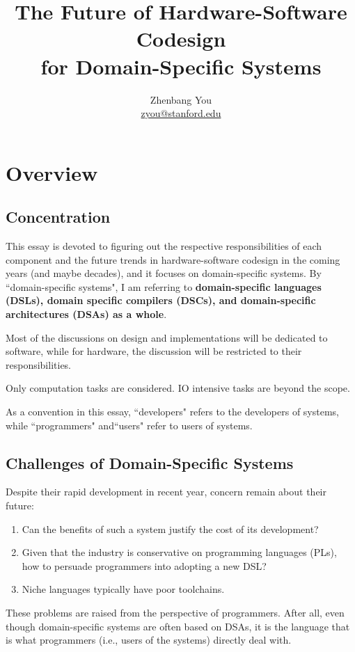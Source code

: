 \documentclass[11pt]{article}
\title{The Future of Hardware-Software Codesign\\for Domain-Specific Systems}
\author{Zhenbang You\\ \href{zyou@stanford.edu}{zyou@stanford.edu}}
\date{}
\begin{document}
\maketitle

\section{Overview}

\subsection{Concentration}
This essay is devoted to figuring out the respective responsibilities of each component and the future trends in hardware-software codesign in the coming years (and maybe decades), and it focuses on domain-specific systems.
By ``domain-specific systems", I am referring to \textbf{domain-specific languages (DSLs), domain specific compilers (DSCs), and domain-specific architectures (DSAs) as a whole}.

Most of the discussions on design and implementations will be dedicated to software, while for hardware, the discussion will be restricted to their responsibilities.

Only computation tasks are considered.
IO intensive tasks are beyond the scope.

As a convention in this essay, ``developers" refers to the developers of systems, while ``programmers" and``users" refer to users of systems.

\subsection{Challenges of Domain-Specific Systems}
Despite their rapid development in recent year, concern remain about their future:
\begin{enumerate}
    \item Can the benefits of such a system justify the cost of its development?
    \item Given that the industry is conservative on programming languages (PLs), how to persuade programmers into adopting a new DSL?
    \item Niche languages typically have poor toolchains.
\end{enumerate}
These problems are raised from the perspective of programmers.
After all, even though domain-specific systems are often based on DSAs, it is the language that is what programmers (i.e., users of the systems) directly deal with.
\end{document}
